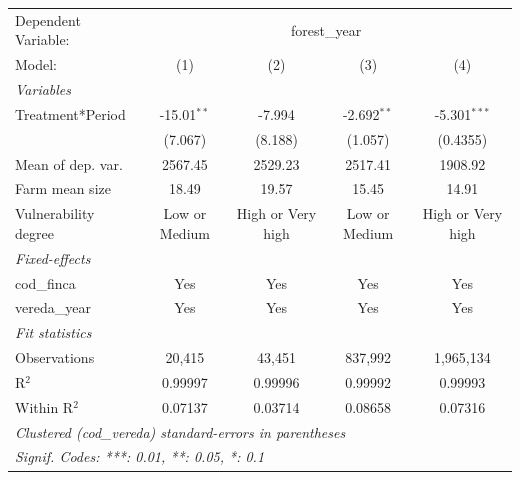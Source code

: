 
\begingroup
\centering
\begin{tabular}{lcccc}
   \tabularnewline \midrule \midrule
   Dependent Variable: & \multicolumn{4}{c}{forest\_year}\\
   Model:               & (1)           & (2)               & (3)           & (4)\\  
   \midrule
   \emph{Variables}\\
   Treatment*Period     & -15.01$^{**}$ & -7.994            & -2.692$^{**}$ & -5.301$^{***}$\\   
                        & (7.067)       & (8.188)           & (1.057)       & (0.4355)\\   
   Mean of dep. var.    & 2567.45       & 2529.23           & 2517.41       & 1908.92\\  
   Farm mean size       & 18.49         & 19.57             & 15.45         & 14.91\\  
   Vulnerability degree & Low or Medium & High or Very high & Low or Medium & High or Very high\\  
   \midrule
   \emph{Fixed-effects}\\
   cod\_finca           & Yes           & Yes               & Yes           & Yes\\  
   vereda\_year         & Yes           & Yes               & Yes           & Yes\\  
   \midrule
   \emph{Fit statistics}\\
   Observations         & 20,415        & 43,451            & 837,992       & 1,965,134\\  
   R$^2$                & 0.99997       & 0.99996           & 0.99992       & 0.99993\\  
   Within R$^2$         & 0.07137       & 0.03714           & 0.08658       & 0.07316\\  
   \midrule \midrule
   \multicolumn{5}{l}{\emph{Clustered (cod\_vereda) standard-errors in parentheses}}\\
   \multicolumn{5}{l}{\emph{Signif. Codes: ***: 0.01, **: 0.05, *: 0.1}}\\
\end{tabular}
\par\endgroup


